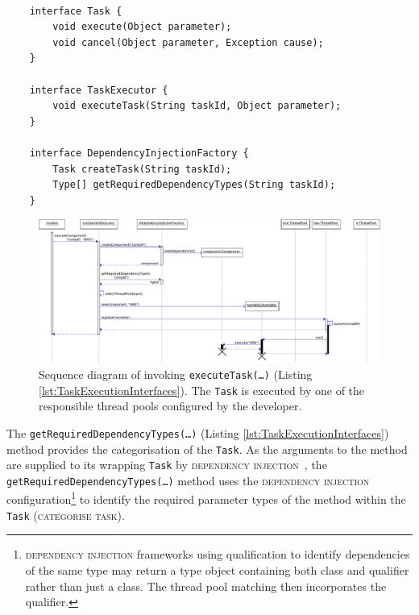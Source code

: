 \documentclass[prodmode]{style/acmlarge}
\begin{document}
\begin{lstlisting}[float,label=lst:TaskExecutionInterfaces]

    interface Task {
        void execute(Object parameter); 
        void cancel(Object parameter, Exception cause);
    }

    interface TaskExecutor {
        void executeTask(String taskId, Object parameter);
    }

    interface DependencyInjectionFactory {
        Task createTask(String taskId);
        Type[] getRequiredDependencyTypes(String taskId);
    }
\end{lstlisting}


\begin{figure}[!t]
\centering
\includegraphics[width=6in]{ExecuteComponentSequenceDiagram}
\caption{Sequence diagram of invoking \texttt{executeTask(\ldots)} (Listing \ref{lst:TaskExecutionInterfaces}).  The \texttt{Task} is executed by one of the responsible thread pools configured by the developer.}
\label{fig:ExecuteComponentSequenceDiagram}
\end{figure}

The \texttt{getRequiredDependencyTypes(\ldots)} (Listing
\ref{lst:TaskExecutionInterfaces}) method provides the categorisation of the
\texttt{Task}.  As the arguments to the method are supplied to its wrapping
\texttt{Task} by \textsc{dependency injection}~\cite{ioc}, the
\texttt{getRequiredDependencyTypes(\ldots)} method uses the
\textsc{dependency injection} configuration\footnote{\textsc{dependency injection}
frameworks using qualification to identify dependencies of the same type may
return a type object containing both class and qualifier rather than just a
class.  The thread pool matching then incorporates the qualifier.} to identify
the required parameter types of the method within the \texttt{Task}
(\textsc{categorise task}).
\end{document}
